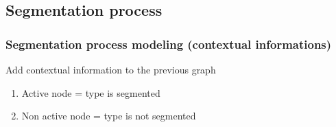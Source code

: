 
\subsection[Segmentation process]{Segmentation process}
	\begin{frame}
		\frametitle{Segmentation process modeling (contextual informations)}
		\begin{block}{Add contextual information to the previous graph}
					\begin{enumerate}
						\item Active node = type is segmented
						\item Non active node = type is not segmented
					\end{enumerate}					
				\end{block}	
		\begin{columns}[c]
		

\end{columns}
\end{frame}
